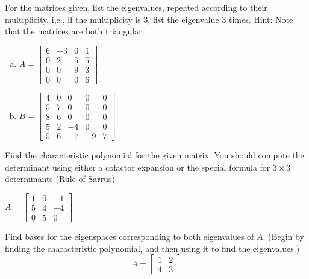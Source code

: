 \begin{exercise} %
	For the matrices given, list the eigenvalues, repeated according to their multiplicity, i,e., if the multiplicity is 3, list the eigenvalue 3 times. Hint: Note that the matrices are both triangular.
	\begin{multicols}{2}
		\begin{enumerate}[(a)]
			\item $ A= \begin{bmatrix}6&-3&0&1\\0&2&5&5\\0&0&9&3\\0&0&0&6\end{bmatrix} $
			\item $ B= \begin{bmatrix}4&0&0&0&0\\5&7&0&0&0\\8&6&0&0&0\\5&2&-4&0&0\\5&6&-7&-9&7\end{bmatrix} $
		\end{enumerate}
	\end{multicols}
\end{exercise}
\vspace{.5in}


\newpage


\begin{exercise} %
	Find the characteristic polynomial for the given matrix. You should compute the determinant using either a cofactor expansion or the special formula for $3\times 3$ determinants (Rule of Sarrus).
	
	$ A = \begin{bmatrix}1&0&-1\\5&4&-4\\0&5&0\end{bmatrix} $
\end{exercise}
\vfill


\begin{exercise} %
	Find bases for the eigenspaces corresponding to both eigenvalues of $A$. (Begin by finding the characteristic polynomial, and then using it to find the eigenvalues.)
	$$ A=\begin{bmatrix}1&2\\4&3\end{bmatrix} $$
\end{exercise}
\vfill


